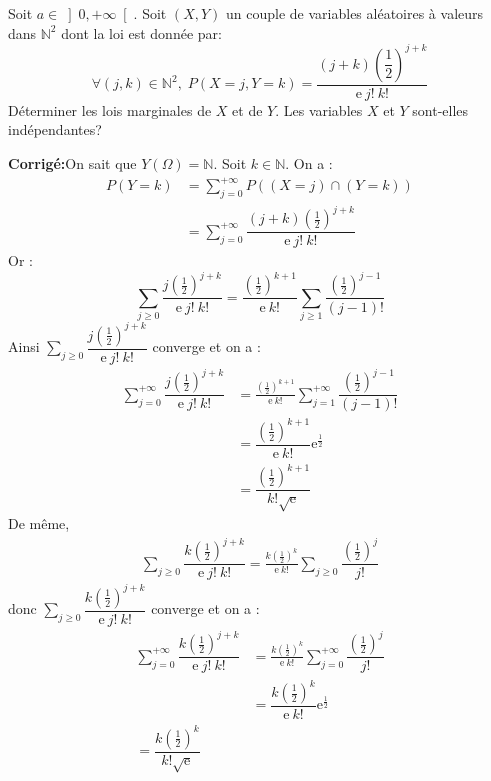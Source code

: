 \documentclass[a4paper,twoside,french,11pt]{VcCours}
\newcommand{\corr}{\textbf{Corrigé:}}
\begin{document}
\begin{Exercice}{} Soit $a\in {\left] 0,+\infty\right[ }$. Soit $(X,Y)$ un couple de variables aléatoires à valeurs dans $\mathbb{N}^2$ dont la loi est donnée par: 
$$\forall (j,k)\in {\mathbb{N}^2}, \; P(X=j,Y=k)=\dfrac{(j+k)\left( \dfrac{1}{2}\right) ^{j+k}}{\mathrm{e}\:j!\:k!}$$
Déterminer les lois marginales de $X$ et de $Y$. Les variables $X$ et $Y$ sont-elles indépendantes?
\end{Exercice}

\corr On sait que $Y(\Omega)=\mathbb{N}$. Soit $k\in\mathbb{N}$. On a :
\begin{align*}
 P(Y=k)& =\sum\limits_{j=0}^{+\infty} P((X=j) \cap (Y=k)) \\
 & =\sum\limits_{j=0}^{+\infty}\dfrac{(j+k)\left( \tfrac{1}{2}\right) ^{j+k}}{\text{e}\:j!\:k!}
 \end{align*}
Or :
 $$\sum\limits_{j\geq 0}^{}\dfrac{j\left(\tfrac{1}{2} \right) ^{j+k}}{\text{e}\:j!\:k!}=\dfrac{\left(\tfrac{1}{2} \right)^{k+1}}{\text{e}\:k!}\sum\limits_{j\geq 1}^{}\dfrac{\left(\tfrac{1}{2} \right)^{j-1}}{(j-1)!}$$
Ainsi $\sum\limits_{j\geq 0}^{}\dfrac{j\left(\tfrac{1}{2} \right)^{j+k}}{\text{e}\:j!\:k!}$ converge et on a :
\begin{align*}
\sum\limits_{j=0}^{+\infty}\dfrac{j\left(\tfrac{1}{2} \right)^{j+k}}{\text{e}\:j!\:k!}& =\frac{\left(\tfrac{1}{2} \right)^{k+1}}{\text{e}\:k!}\sum\limits_{j=1}^{+\infty}\dfrac{\left(\tfrac{1}{2} \right)^{j-1}}{(j-1)!} \\
& =\dfrac{\left(\tfrac{1}{2} \right)^{k+1}}{\text{e}\:k!}\text{e}^{\tfrac{1}{2}} \\
& =\dfrac{\left(\tfrac{1}{2} \right)^{k+1}}{k!\sqrt{\mathrm{e}}}
\end{align*}
De même,  
\begin{align*}
\sum\limits_{j\geq 0}^{}\dfrac{k\left(\tfrac{1}{2} \right)^{j+k}}{\text{e}\:j!\:k!}=\frac{k\left(\tfrac{1}{2} \right)^{k}}{\text{e}\:k!}\sum\limits_{j\geq 0}^{}\dfrac{\left(\tfrac{1}{2} \right)^{j}}{j!}
\end{align*}
donc $\sum\limits_{j\geq 0}^{}\dfrac{k\left(\tfrac{1}{2} \right)^{j+k}}{\text{e}\:j!\:k!}$ converge et on a :
\begin{align*}
\sum\limits_{j=0}^{+\infty}\dfrac{k\left(\tfrac{1}{2} \right)^{j+k}}{\text{e}\:j!\:k!}& =\frac{k\left(\tfrac{1}{2} \right)^{k}}{\text{e}\:k!}\sum\limits_{j=0}^{+\infty}\dfrac{\left(\tfrac{1}{2} \right)^{j}}{j!} \\
& =\dfrac{k\left(\tfrac{1}{2} \right)^{k}}{\text{e}\:k!}\text{e}^{\tfrac{1}{2}}\\
=\dfrac{k\left(\tfrac{1}{2} \right)^{k}}{k!\sqrt{\mathrm{e}}}
\end{align*}
\end{document}

